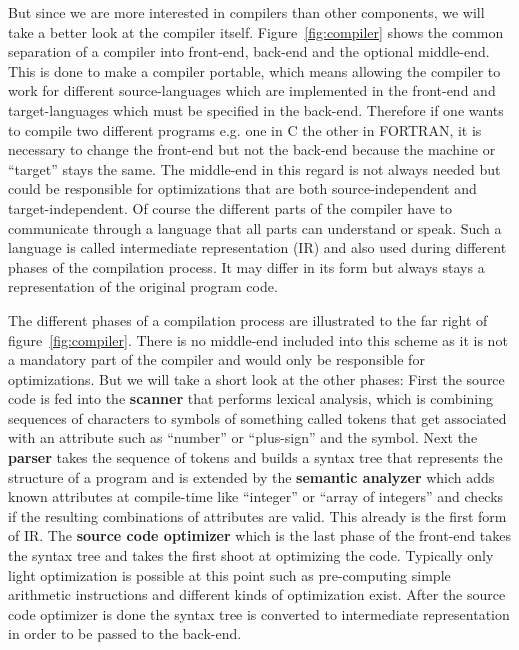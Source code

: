 But since we are more interested in compilers than other components, we will take a better look at the compiler itself.
Figure~\ref{fig:compiler} shows the common separation of a compiler into front-end, back-end and the optional middle-end.
This is done to make a compiler portable, which means allowing the compiler to work for different source-languages which are implemented in the front-end and target-languages which must be specified in the back-end.
Therefore if one wants to compile two different programs e.g. one in C the other in FORTRAN, it is necessary to change the front-end but not the back-end because the machine or ``target'' stays the same.
The middle-end in this regard is not always needed but could be responsible for optimizations that are both source-independent and target-independent.
Of course the different parts of the compiler have to communicate through a language that all parts can understand or speak.
Such a language is called intermediate representation (IR) and also used during different phases of the compilation process.
It may differ in its form but always stays a representation of the original program code.

The different phases of a compilation process are illustrated to the far right of figure~\ref{fig:compiler}.
There is no middle-end included into this scheme as it is not a mandatory part of the compiler and would only be responsible for optimizations.
But we will take a short look at the other phases:
First the source code is fed into the \textbf{scanner} that performs lexical analysis, which is combining sequences of characters to symbols of something called tokens that get associated with an attribute such as ``number'' or ``plus-sign'' and the symbol.
Next the \textbf{parser} takes the sequence of tokens and builds a syntax tree that represents the structure of a program and is extended by the \textbf{semantic analyzer} which adds known attributes at compile-time like ``integer'' or ``array of integers'' and checks if the resulting combinations of attributes are valid.
This already is the first form of IR.
The \textbf{source code optimizer} which is the last phase of the front-end takes the syntax tree and takes the first shoot at optimizing the code.
Typically only light optimization is possible at this point such as pre-computing simple arithmetic instructions and different kinds of optimization exist.
After the source code optimizer is done the syntax tree is converted to intermediate representation in order to be passed to the back-end.

